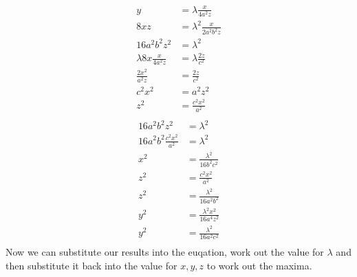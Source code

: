 \documentclass[10pt,\jkfside,a4paper]{article}
\begin{document}
\begin{enumerate}
\begin{equation}
\begin{split}
y &= \lambda\frac{x}{4a^2z} \\
8xz &= \lambda^2\frac{x}{2a^2b^2z} \\
16a^2b^2z^2 &= \lambda^2 \\
\lambda8x\frac{x}{4a^2z} &= \lambda\frac{2z}{c^2} \\
\frac{2x^{2}}{a^2z} &= \frac{2z}{c^2} \\
c^2x^{2} &= a^2z^2 \\
z^2 &= \frac{c^2x^{2}}{a^2} \\
\end{split}
\end{equation}
\begin{equation}
\begin{split}
16a^2b^2z^2 &= \lambda^2 \\
16a^2b^2\frac{c^2x^{2}}{a^2} &= \lambda^2 \\
x^{2} &= \frac{\lambda^2}{16b^2c^2} \\
z^2 &= \frac{c^2x^{2}}{a^2} \\
z^2 &= \frac{\lambda^2}{16a^2b^2} \\
y^{2} &= \frac{\lambda^2x^{2}}{16a^4z^2} \\
y^{2} &= \frac{\lambda^2}{16a^2c^2} \\
\end{split}
\end{equation}
Now we can substitute our results into the euqation, work out the value for $\lambda$ and 
then substitute it back into the value for $x, y, z$ to work out the maxima.


\end{enumerate}
\end{document}
